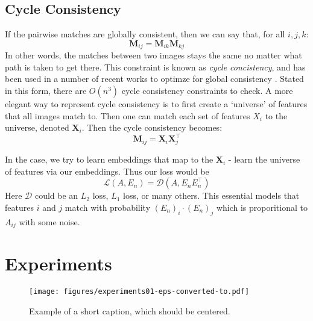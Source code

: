 \documentclass[10pt,twocolumn,letterpaper]{article}
\newcommand{\mat}[1]{\mathbf{#1}}
\begin{document}
\subsection{Cycle Consistency}
If the pairwise matches are globally consistent, then we can say that, for all $i, j, k$:
\begin{equation}
\mat{M}_{ij} = \mat{M}_{ik} \mat{M}_{kj}
\label{eq:cycconsist1}
\end{equation}
In other words, the matches between two images stays the same no matter what path is taken to get there. 
This constraint is known as \textit{cycle concistency}, and has been used in a number of recent works to optimze for global consistency \cite{zhou2015multi, wang2017multi, leonardos2016distributed}.
Stated in this form, there are $O(n^3)$ cycle consistency constraints to check.
A more elegant way to represent cycle consistency is to first create a `universe' of features that all images match to.
Then one can match each set of features $X_i$ to the universe, denoted $\mat{X}_i$.
Then the cycle consistency becomes:
\begin{equation}
\mat{M}_{ij} = \mat{X}_{i}\mat{X}_{j}^\top
\label{eq:cycconsist2}
\end{equation}

In the case, we try to learn embeddings that map to the $\mat{X}_i$ - learn the universe of features via our embeddings.
Thus our loss would be 
\begin{equation}
\mathcal{L}(A, E_n) = \mathcal{D}(A, E_nE_n^\top)
\end{equation}
Here $\mathcal{D}$ could be an $L_2$ loss, $L_1$ loss, or many others. 
This essential models that features $i$ and $j$ match with probability $(E_n)_i \cdot (E_n)_j$
which is proporitional to $A_{ij}$ with some noise.


\section{Experiments}

\begin{figure*}
\begin{center}
  \texttt{[image: figures/experiments01-eps-converted-to.pdf]}
  \end{center}
     \caption{Example of a short caption, which should be centered.}
  \label{fig:short}
\end{figure*}
\end{document}
